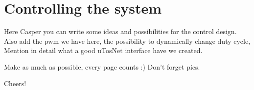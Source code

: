 \chapter{Controlling the system}
Here Casper you can write some ideas and possibilities for the control design.
Also add the pwm we have here, the possibility to dynamically change duty cycle, 
Mention in detail what a good uTosNet interface have we created.

Make as much as possible, every page counts :) Don't forget pics.

Cheers!